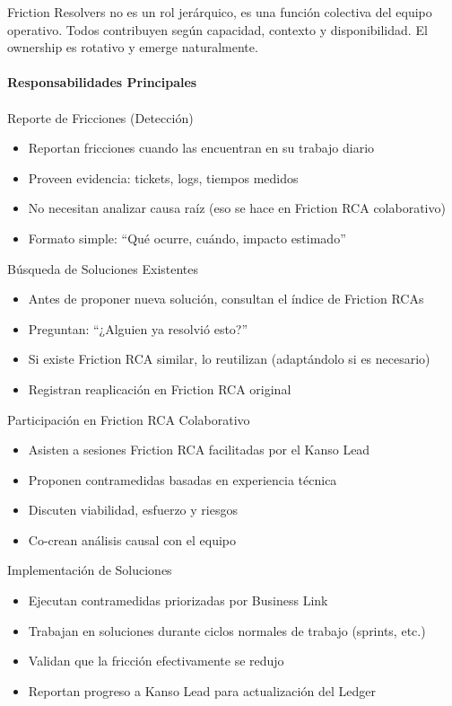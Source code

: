 Friction Resolvers no es un rol jerárquico, es una función colectiva del equipo operativo. Todos contribuyen según capacidad, contexto y disponibilidad. El ownership es rotativo y emerge naturalmente.\\
\\
\textbf{Responsabilidades Principales}
\\
\\
Reporte de Fricciones (Detección)
\begin{itemize}
    \item Reportan fricciones cuando las encuentran en su trabajo diario
    \item Proveen evidencia: tickets, logs, tiempos medidos
    \item No necesitan analizar causa raíz (eso se hace en Friction RCA colaborativo)
    \item Formato simple: ``Qué ocurre, cuándo, impacto estimado''
\end{itemize}

Búsqueda de Soluciones Existentes
\begin{itemize}
    \item Antes de proponer nueva solución, consultan el índice de Friction RCAs
    \item Preguntan: ``¿Alguien ya resolvió esto?''
    \item Si existe Friction RCA similar, lo reutilizan (adaptándolo si es necesario)
    \item Registran reaplicación en Friction RCA original
\end{itemize}

Participación en Friction RCA Colaborativo
\begin{itemize}
    \item Asisten a sesiones Friction RCA facilitadas por el Kanso Lead
    \item Proponen contramedidas basadas en experiencia técnica
    \item Discuten viabilidad, esfuerzo y riesgos
    \item Co-crean análisis causal con el equipo
\end{itemize}

Implementación de Soluciones
\begin{itemize}
    \item Ejecutan contramedidas priorizadas por Business Link
    \item Trabajan en soluciones durante ciclos normales de trabajo (sprints, etc.)
    \item Validan que la fricción efectivamente se redujo
    \item Reportan progreso a Kanso Lead para actualización del Ledger
\end{itemize}

